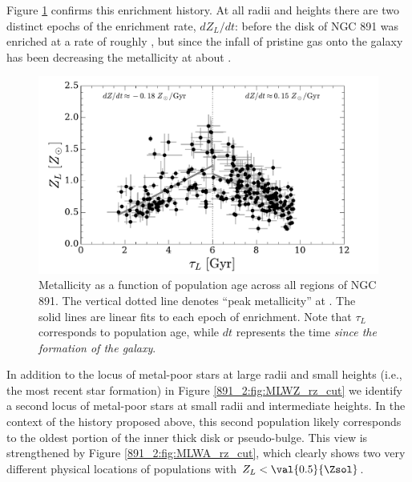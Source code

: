 Figure \ref{891_2:fig:tau_Z} confirms this enrichment history. At all
radii and heights there are two distinct epochs of the enrichment
rate, $dZ_L/dt$: before  the disk of NGC 891 was enriched
at a rate of roughly , but since  the
infall of pristine gas onto the galaxy has been decreasing the
metallicity at about .

\begin{figure}
  \centering
  \includegraphics[width=\textwidth]{891_2/figs/tau_Z.pdf}
  \caption[Enrichment history in NGC
  891]{\fixspacing\label{891_2:fig:tau_Z}Metallicity as a function of
    population age across all regions of NGC 891. The vertical dotted
    line denotes ``peak metallicity'' at . The solid lines
    are linear fits to each epoch of enrichment. Note that $\tau_L$
    corresponds to population age, while $dt$ represents the time
    \emph{since the formation of the galaxy}.}
\end{figure}

In addition to the locus of metal-poor stars at large radii and small
heights (i.e., the most recent star formation) in Figure
\ref{891_2:fig:MLWZ_rz_cut} we identify a second locus of metal-poor
stars at small radii and intermediate heights. In the context of the
history proposed above, this second population likely corresponds to
the oldest portion of the inner thick disk or pseudo-bulge. This view
is strengthened by Figure \ref{891_2:fig:MLWA_rz_cut}, which clearly
shows two very different physical locations of populations with $Z_L <
\val{0.5}{\Zsol}$.

